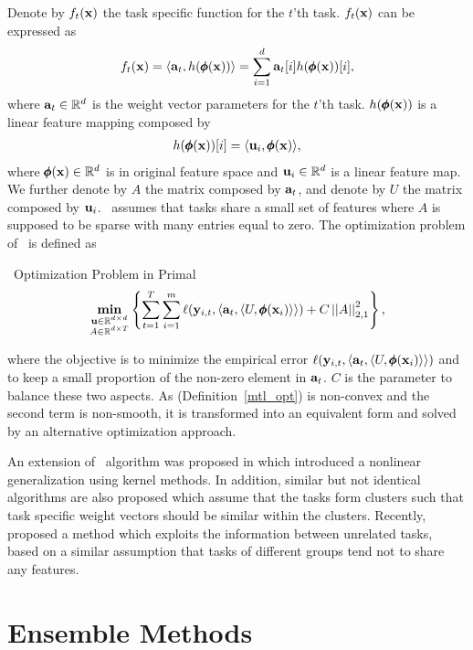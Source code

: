 {Denote by $f_t(\mathbf {x})$ the task specific function for the $t$'th task.
$f_t(\mathbf {x})$ can be expressed as
\begin{align*}
	f_t(\mathbf {x}) = \langle \mathbf {a}_t, h(\pmb \phi(\mathbf {x})) \rangle = \sum_{i=1}^{d}\mathbf {a}_{t}[i]h(\pmb \phi(\mathbf {x}))[i],
\end{align*}
where $\mathbf {a}_t\in\mathbb{R}^d$ is the weight vector parameters for the $t$'th task.
$h(\pmb \phi(\mathbf {x}))$ is a linear feature mapping composed by
\begin{align*}
	h(\pmb \phi(\mathbf {x}))[i] = \langle \mathbf {u}_i, \pmb \phi(\mathbf {x}) \rangle,
\end{align*}
where $\pmb \phi(\mathbf {x})\in\mathbb{R}^d$ is in original feature space and $\mathbf {u}_i\in\mathbb{R}^{d}$ is a linear feature map.
We further denote by $A$ the matrix composed by $\mathbf {a}_{t}$, and denote by $U$ the matrix composed by $\mathbf {u}_i$.
\mtl\ assumes that tasks share a small set of features where $A$ is supposed to be sparse with many entries equal to zero.
The optimization problem of \mtl\ is defined as
\begin{definition}{\mtl\ Optimization Problem in Primal}\label{mtl_opt}
	\begin{align*}
		\underset{\substack{\mathbf {u}\in\mathbb{R}^{d\times d}\\A\in\mathbb{R}^{d\times T}}}{\textbf{min}} \left\{\sum_{t=1}^{T}\sum_{i=1}^{m}\ell(\mathbf {y}_{i,t},\langle \mathbf {a}_t, \langle U, \pmb \phi(\mathbf {x}_i) \rangle \rangle)+C\left|\left| A \right|\right|_{2,1}^2\right\},
	\end{align*}
\end{definition}
where the objective is to minimize the empirical error $\ell(\mathbf {y}_{i,t},\langle \mathbf {a}_t, \langle U, \pmb \phi(\mathbf {x}_i) \rangle \rangle)$ and to keep a small proportion of the non-zero element in $\mathbf {a}_t$.
$C$ is the parameter to balance these two aspects.
As (Definition~\ref{mtl_opt}) is non-convex and the second term is non-smooth, it is transformed into an equivalent form and solved by an alternative optimization approach.

An extension of \mtl\ algorithm was proposed in \citep{Argyriou08convex} which introduced a nonlinear generalization using kernel methods.
In addition, similar but not identical algorithms \citep{Argyriou08an,Jacob09cluster} are also proposed which assume that the tasks form clusters such that task specific weight vectors should be similar within the clusters.
Recently, \citet{Paredes12exploit} proposed a method which exploits the information between unrelated tasks, based on a similar assumption that tasks of different groups tend not to share any features.

%
\section{Ensemble Methods}\label{sc_ensemble}

}
